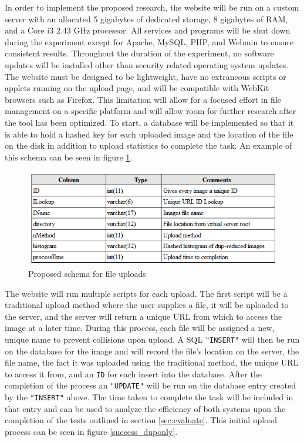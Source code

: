 \documentclass[11pt]{article}
\begin{document}
In order to implement the proposed research, the website will be run on a custom server with an allocated 5 gigabytes of dedicated storage, 8 gigabytes of RAM, and a Core i3 2.43 GHz processor. All services and programs will be shut down during the experiment except for Apache, MySQL, PHP, and Webmin to ensure consistent results. Throughout the duration of the experiment, no software updates will be installed other than security related operating system updates. The website must be designed to be lightweight, have no extraneous scripts or applets running on the upload page, and will be compatible with WebKit browsers such as Firefox. This limitation will allow for a focused effort in file management on a specific platform and will allow room for further research after the tool has been optimized. To start, a database will be implemented so that it is able to hold a hashed key for each uploaded image and the location of the file on the disk in addition to upload statistics to complete the task. An example of this schema can be seen in figure \ref{fig:schema}.

\begin{figure}[htbp]
\centering
\includegraphics[width=5in]{schema}
\caption{Proposed schema for file uploads}
\label{fig:schema}
\end{figure}

The website will run multiple scripts for each upload. The first script will be a traditional upload method where the user supplies a file, it will be uploaded to the server, and the server will return a unique URL from which to access the image at a later time. During this process, each file will be assigned a new, unique name to prevent collisions upon upload. A SQL {\tt "INSERT"} will then be run on the database for the image and will record the file's location on the server, the file name, the fact it was uploaded using the traditional method, the unique URL to access it from, and an {\tt ID} for each insert into the database. After the completion of the process an {\tt "UPDATE"} will be run on the database entry created by the {\tt "INSERT"} above. The time taken to complete the task will be included in that entry and can be used to analyze the efficiency of both systems upon the completion of the tests outlined in section \ref{sec:evaluate}. This initial upload process can be seen in figure \ref{success_duponly}.
\end{document}
